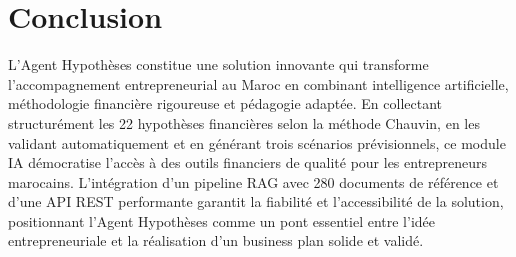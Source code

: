 \documentclass[11pt, a4paper]{article}
\begin{document}
\section{Conclusion}

L'Agent Hypothèses constitue une solution innovante qui transforme l'accompagnement entrepreneurial au Maroc en combinant intelligence artificielle, méthodologie financière rigoureuse et pédagogie adaptée. En collectant structurément les 22 hypothèses financières selon la méthode Chauvin, en les validant automatiquement et en générant trois scénarios prévisionnels, ce module IA démocratise l'accès à des outils financiers de qualité pour les entrepreneurs marocains. L'intégration d'un pipeline RAG avec 280 documents de référence et d'une API REST performante garantit la fiabilité et l'accessibilité de la solution, positionnant l'Agent Hypothèses comme un pont essentiel entre l'idée entrepreneuriale et la réalisation d'un business plan solide et validé.
\end{document}
